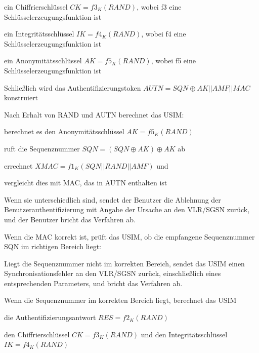 \documentclass[a4paper]{article}
\begin{document}
\begin{multicols}{3}
\begin{itemize*}
\begin{itemize*}
\begin{itemize*}
                        \item ein Chiffrierschlüssel $CK = f3_K(RAND)$, wobei f3 eine Schlüsselerzeugungsfunktion ist
                        \item ein Integritätsschlüssel $IK = f4_K(RAND)$, wobei f4 eine Schlüsselerzeugungsfunktion ist
                        \item ein Anonymitätsschlüssel $AK = f5_K(RAND)$, wobei f5 eine Schlüsselerzeugungsfunktion ist
                  \end{itemize*}
                  \item Schließlich wird das Authentifizierungstoken $AUTN = SQN \oplus AK || AMF || MAC$ konstruiert
            \end{itemize*}
            \begin{itemize*}
                  \item Nach Erhalt von RAND und AUTN berechnet das USIM:
                  \item berechnet es den Anonymitätsschlüssel $AK = f5_K (RAND)$
                  \item ruft die Sequenznummer $SQN = (SQN \oplus AK) \oplus AK$ ab
                  \item errechnet $XMAC = f1_K (SQN || RAND || AMF)$ und
                  \item vergleicht dies mit MAC, das in AUTN enthalten ist
                  \item Wenn sie unterschiedlich sind, sendet der Benutzer die Ablehnung der Benutzerauthentifizierung mit Angabe der Ursache an den VLR/SGSN zurück, und der Benutzer bricht das Verfahren ab.
                  \item Wenn die MAC korrekt ist, prüft das USIM, ob die empfangene Sequenznummer SQN im richtigen Bereich liegt:
                  \begin{itemize*}
                        \item Liegt die Sequenznummer nicht im korrekten Bereich, sendet das USIM einen Synchronisationsfehler an den VLR/SGSN zurück, einschließlich eines entsprechenden Parameters, und bricht das Verfahren ab.
                  \end{itemize*}
                  \item Wenn die Sequenznummer im korrekten Bereich liegt, berechnet das USIM
                  \begin{itemize*}
                        \item die Authentifizierungsantwort $RES = f2_K(RAND)$
                        \item den Chiffrierschlüssel $CK = f3_K(RAND)$ und den Integritätsschlüssel $IK = f4_K(RAND)$
                  \end{itemize*}
            \end{itemize*}
      \end{itemize*}


\end{multicols}
\end{document}
